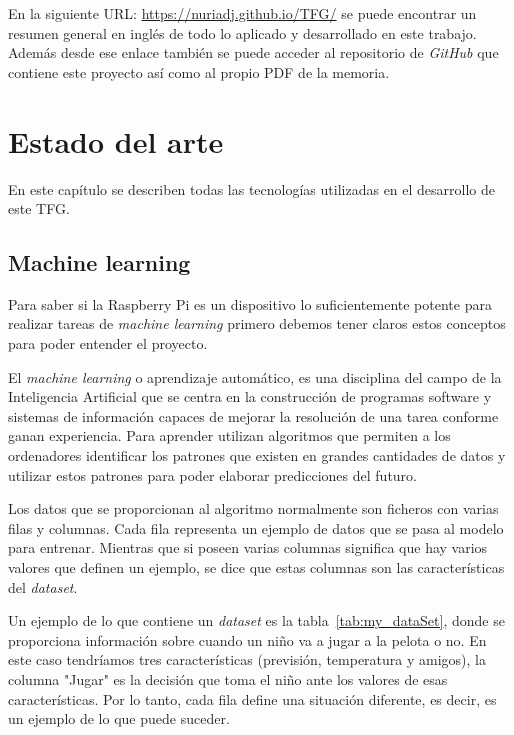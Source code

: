\documentclass[a4paper, 12pt]{book}
\begin{document}
En la siguiente URL:  \url{https://nuriadj.github.io/TFG/} se puede encontrar un resumen general en inglés de todo lo aplicado y desarrollado en este trabajo. Además desde ese enlace también se puede acceder al repositorio de \textit{GitHub} que contiene este proyecto así como al propio PDF de la memoria.

\cleardoublepage


\chapter{Estado del arte}               %
\label{chap:tecnologias}

En este capítulo se describen todas las tecnologías utilizadas en el desarrollo de este TFG.

\section{Machine learning}
\label{sec:machine_learning}

Para saber si la Raspberry Pi es un dispositivo lo suficientemente potente para realizar tareas de \textit{machine learning} primero debemos tener claros estos conceptos para poder entender el proyecto.

 El \textit{machine learning} o aprendizaje automático, es una disciplina del campo de la Inteligencia Artificial que se centra en la construcción de programas software y sistemas de información capaces de mejorar la resolución de una tarea conforme ganan experiencia. Para aprender utilizan algoritmos que permiten a los ordenadores identificar los patrones que existen en grandes cantidades de datos y utilizar estos patrones para poder elaborar predicciones del futuro. 
 
 Los datos que se proporcionan al algoritmo normalmente son ficheros con varias filas y columnas. Cada fila representa un ejemplo de datos que se pasa al modelo para entrenar. Mientras que si poseen varias columnas significa que hay varios valores que definen un ejemplo, se dice que estas columnas son las características del \textit{dataset}. 
 
 Un ejemplo de lo que contiene un \textit{dataset} es la tabla~\ref{tab:my_dataSet}, donde se proporciona información sobre cuando un niño va a jugar a la pelota o no. En este caso tendríamos tres características (previsión, temperatura y amigos), la columna "Jugar" es la decisión que toma el niño ante los valores de esas características. Por lo tanto, cada fila define una situación diferente, es decir, es un ejemplo de lo que puede suceder.
 
\end{document}
